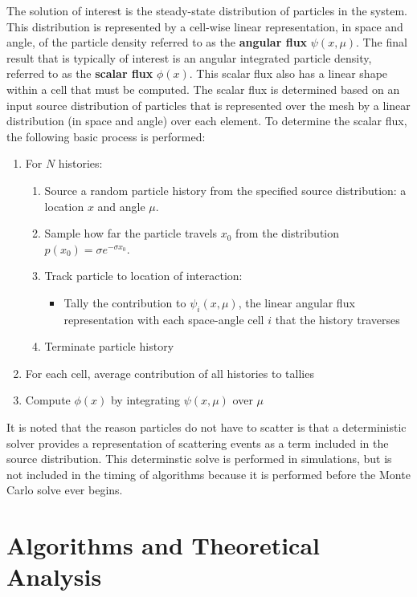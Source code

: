\documentclass[12pt]{article}
\begin{document}
The solution of interest is the steady-state
distribution of particles in the system. This distribution is represented by
a cell-wise linear representation, in space and angle, of the particle density
referred to as the
\textbf{angular flux} $\psi(x,\mu)$. The final result that is typically of interest
is an angular integrated particle density, referred to as the \textbf{scalar flux} 
$\phi(x)$. 
This scalar flux also has a linear shape within a cell that must be computed.  The
scalar flux is determined based on an input source distribution of particles that is represented
over the mesh by a linear distribution (in space and angle) over each element.  To determine
the scalar flux, the following basic
process is performed:
\begin{enumerate}
    \item For $N$ histories:
        \begin{enumerate}
    \item Source a random particle history from the specified source distribution: a
        location $x$ and angle $\mu$.
    \item Sample how far the particle travels $x_0$ from the distribution $p(x_0) =
        \sigma e^{-\sigma x_0}$.
    \item Track particle to location of interaction:
        \begin{itemize}
            \item Tally the contribution to $\psi_i(x,\mu)$, the
                linear angular flux representation with each space-angle cell $i$
                that the history traverses
        \end{itemize}
    \item Terminate particle history
            \end{enumerate}
    \item For each cell, average contribution of all histories to tallies
    \item Compute $\phi(x)$ by integrating $\psi(x,\mu)$ over $\mu$
\end{enumerate}
It is noted that the reason particles do not have to scatter is that a deterministic
solver provides a representation of scattering events as a term included in the
source distribution.  This determinstic solve
is performed in simulations, but is not included in the timing of algorithms because it is
performed before the Monte Carlo solve ever begins.

\section{Algorithms and Theoretical Analysis}
\end{document}
